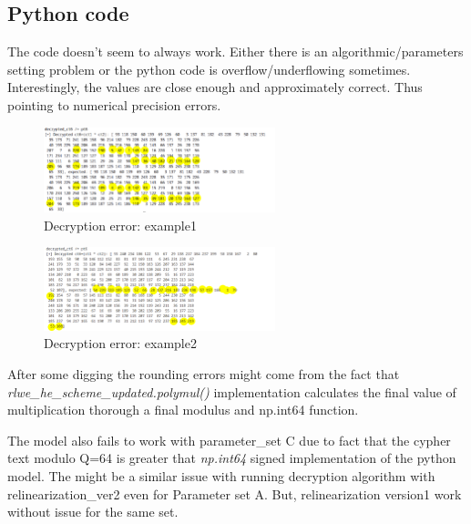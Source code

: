 \documentclass{article}
\begin{document}
   \subsection{Python code}

      The code doesn't seem to always work. Either there is an algorithmic/parameters setting 
      problem or the python code is overflow/underflowing sometimes. Interestingly, the values 
      are close enough and approximately correct. Thus pointing to numerical precision errors.

      \begin{figure}[hb] 
            \centering
            \includegraphics[width=0.6\textwidth]{errored_decryption.png} 
            \caption{Decryption error: example1} 
            \label{fig:errored_dec1}
      \end{figure}

      \begin{figure}[htp] 
            \centering
            \includegraphics[width=0.6\textwidth]{errored_decryption2.png}
            \caption{Decryption error: example2}
            \label{fig:errored_dec2} 
      \end{figure}

      After some digging the rounding errors might come from the fact that \textit{rlwe\_he\_scheme\_updated.polymul()}
      implementation calculates the final value of multiplication thorough a final modulus
      and np.int64\(\) function.

      The model also fails to work with parameter\_set C due to fact that the cypher text modulo Q=64 is greater that \textit{np.int64\(\)}
      signed implementation of the python model. The might be a similar issue with running decryption algorithm with relinearization\_ver2
      even for Parameter set A. But, relinearization version1 work without issue for the same set.
\end{document}
